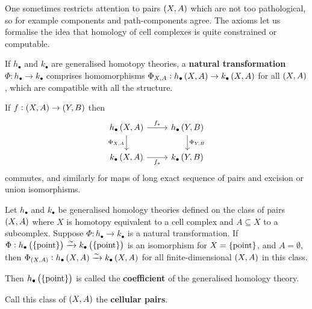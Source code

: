 One sometimes restricts attention to pairs $ \br{X, A} $ which are not too pathological, so for example components and path-components agree. The axioms let us formalise the idea that homology of cell complexes is quite constrained or computable.

\begin{definition*}
If $ h_\bullet $ and $ k_\bullet $ are generalised homotopy theories, a \textbf{natural transformation} $ \Phi : h_\bullet \to k_\bullet $ comprises homomorphisms $ \Phi_{X, A} : h_\bullet\br{X, A} \to k_\bullet\br{X, A} $ for all $ \br{X, A} $, which are compatible with all the structure.
\end{definition*}

\begin{example*}
If $ f : \br{X, A} \to \br{Y, B} $ then
$$
\begin{tikzcd}
h_\bullet\br{X, A} \arrow{r}{f_*} \arrow{d}[swap]{\Phi_{X, A}} & h_\bullet\br{Y, B} \arrow{d}{\Phi_{Y, B}} \\
k_\bullet\br{X, A} \arrow{r}[swap]{f_*} & k_\bullet\br{Y, B}
\end{tikzcd}
$$
commutes, and similarly for maps of long exact sequence of pairs and excision or union isomorphisms.
\end{example*}

\begin{proposition}
Let $ h_\bullet $ and $ k_\bullet $ be generalised homology theories defined on the class of pairs $ \br{X, A} $ where $ X $ is homotopy equivalent to a cell complex and $ A \subseteq X $ to a subcomplex. Suppose $ \Phi : h_\bullet \to k_\bullet $ is a natural transformation. If $ \Phi : h_\bullet\br{\pt} \xrightarrow{\sim} k_\bullet\br{\pt} $ is an isomorphism for $ X = \pt $, and $ A = \emptyset $, then $ \Phi_{\br{X, A}} : h_\bullet\br{X, A} \xrightarrow{\sim} k_\bullet\br{X, A} $ for all finite-dimensional $ \br{X, A} $ in this class.
\end{proposition}

Then $ h_\bullet\br{\pt} $ is called the \textbf{coefficient} of the generalised homology theory.

\begin{notation*}
Call this class of $ \br{X, A} $ the \textbf{cellular pairs}.
\end{notation*}

\pagebreak

